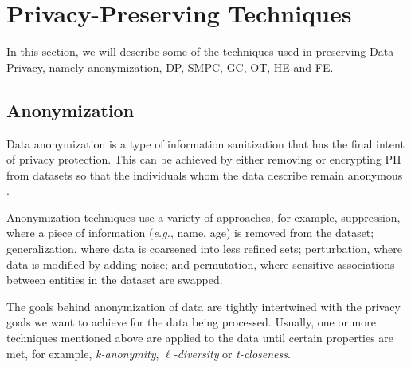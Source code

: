\section{Privacy-Preserving Techniques}
\label{sec:PrivacyPreservingTechniques}


 In this section, we will describe some of the techniques used in preserving Data Privacy, namely anonymization, \ac{DP}, \ac{SMPC}, \ac{GC}, \ac{OT}, \ac{HE} and \ac{FE}.


\subsection{Anonymization}
\label{ssec:Anonymization}


Data anonymization is a type of information sanitization that has the final intent of privacy protection. This can be achieved by either removing or encrypting \ac{PII} from datasets so that the individuals whom the data describe remain anonymous \cite{raghunathan2013}.

Anonymization techniques use a variety of approaches, for example, suppression, where a piece of information (\textit{e.g.}, name, age) is removed from the dataset; generalization, where data is coarsened into less refined sets; perturbation, where data is modified by adding noise; and permutation, where sensitive associations between entities in the dataset are swapped.

The goals behind anonymization of data are tightly intertwined with the privacy goals we want to achieve for the data being processed. Usually, one or more techniques mentioned above are applied to the data until certain properties are met, for example, \textit{k-anonymity}, $\ell$\textit{-diversity} or \textit{t-closeness}.

